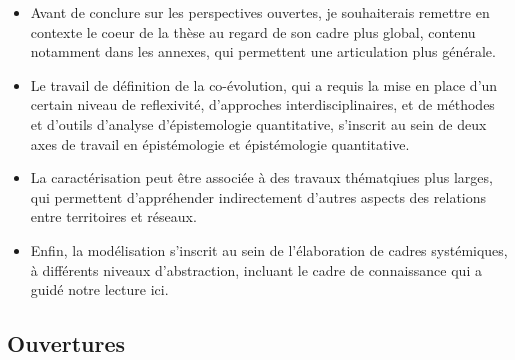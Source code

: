 \documentclass[11pt]{article}
\begin{document}
\begin{itemize}
	\item Avant de conclure sur les perspectives ouvertes, je souhaiterais remettre en contexte le coeur de la thèse au regard de son cadre plus global, contenu notamment dans les annexes, qui permettent une articulation plus générale.
	\item Le travail de définition de la co-évolution, qui a requis la mise en place d'un certain niveau de reflexivité, d'approches interdisciplinaires, et de méthodes et d'outils d'analyse d'épistemologie quantitative, s'inscrit au sein de deux axes de travail en épistémologie et épistémologie quantitative.
	\item La caractérisation peut être associée à des travaux thématqiues plus larges, qui permettent d'appréhender indirectement d'autres aspects des relations entre territoires et réseaux.
	\item Enfin, la modélisation s'inscrit au sein de l'élaboration de cadres systémiques, à différents niveaux d'abstraction, incluant le cadre de connaissance qui a guidé notre lecture ici.
\end{itemize}


\subsection*{Ouvertures}
\end{document}
